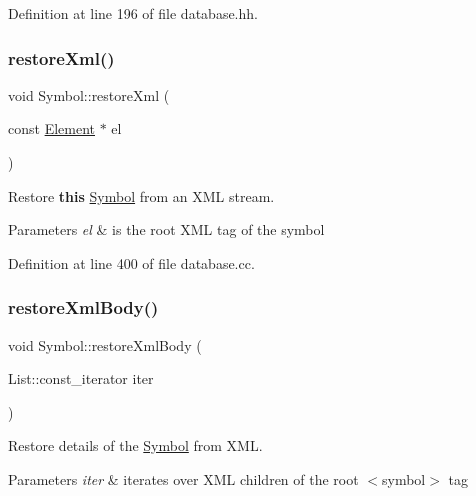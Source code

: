 Definition at line 196 of file database.\+hh.

\mbox{\label{class_symbol_a3266a5752c208bdfa5a28e792de67604}} 
\subsubsection{\texorpdfstring{restoreXml()}{restoreXml()}}
{\footnotesize\ttfamily void Symbol\+::restore\+Xml (\begin{DoxyParamCaption}\item[{const \mbox{\hyperlink{class_element}{Element}} $\ast$}]{el }\end{DoxyParamCaption})\hspace{0.3cm}{\ttfamily [virtual]}}



Restore {\bfseries{this}} \mbox{\hyperlink{class_symbol}{Symbol}} from an X\+ML stream. 


\begin{DoxyParams}{Parameters}
{\em el} & is the root X\+ML tag of the symbol \\
\hline
\end{DoxyParams}


Definition at line 400 of file database.\+cc.

\mbox{\label{class_symbol_ab569bc89bca664b5a6128209f5f3f167}} 
\subsubsection{\texorpdfstring{restoreXmlBody()}{restoreXmlBody()}}
{\footnotesize\ttfamily void Symbol\+::restore\+Xml\+Body (\begin{DoxyParamCaption}\item[{List\+::const\+\_\+iterator}]{iter }\end{DoxyParamCaption})}



Restore details of the \mbox{\hyperlink{class_symbol}{Symbol}} from X\+ML. 


\begin{DoxyParams}{Parameters}
{\em iter} & iterates over X\+ML children of the root $<$symbol$>$ tag \\
\hline
\end{DoxyParams}


